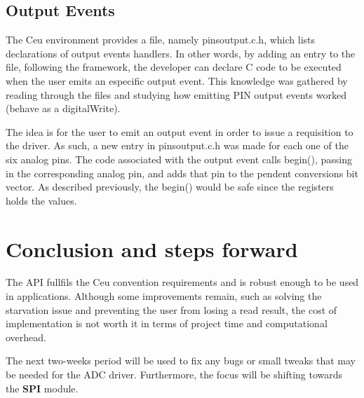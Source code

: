 \documentclass{article}
\begin{document}
\subsection{Output Events}
\tab The Ceu environment provides a file, namely pinsoutput.c.h, which lists declarations of output events handlers. In other words, by adding an entry to the file, following the framework, the developer can declare C code to be executed when the user emits an especific output event. This knowledge was gathered by reading through the files and studying how emitting PIN output events worked (behave as a digitalWrite).
\par The idea is for the user to emit an output event in order to issue a requisition to the driver. As such, a new entry in pinsoutput.c.h was made for each one of the six analog pins. The code associated with the output event calls begin(), passing in the corresponding analog pin, and adds that pin to the pendent conversions bit vector. As described previously, the begin() would be safe since the registers holds the values.
 
\section{Conclusion and steps forward}
\tab The API fullfils the Ceu convention requirements and is robust enough to be used in applications. Although some improvements remain, such as solving the starvation issue and preventing the user from losing a read result, the cost of implementation is not worth it in terms of project time and computational overhead.
\par The next two-weeks period will be used to fix any bugs or small tweaks that may be needed for the ADC driver. Furthermore, the focus will be shifting towards the \textbf{SPI} module.
\end{document}
